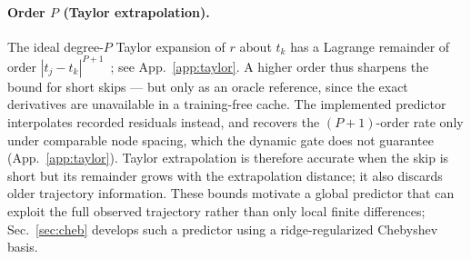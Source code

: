 \documentclass{article} %
\begin{document}
\paragraph{Order $P$ (Taylor extrapolation).}
The ideal degree-$P$ Taylor expansion of $r$ about $t_k$ has a
Lagrange remainder of order $|t_j-t_k|^{P+1}$~\citep[Thm.~3.1]{spectrum};
see App.~\ref{app:taylor}. A higher order thus sharpens the bound for
short skips --- but only as an oracle reference, since the exact
derivatives are unavailable in a training-free cache. The implemented
predictor interpolates recorded residuals instead, and recovers the
$(P{+}1)$-order rate only under comparable node spacing, which the
dynamic gate does not guarantee (App.~\ref{app:taylor}). Taylor
extrapolation is therefore
accurate when the skip is short but its remainder grows with the
extrapolation distance; it also discards older trajectory information.
These bounds motivate a global predictor that can exploit the full
observed trajectory rather than only local finite differences;
Sec.~\ref{sec:cheb} develops such a predictor using a
ridge-regularized Chebyshev basis.
\end{document}
